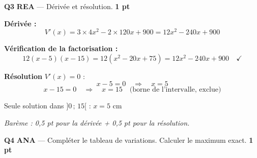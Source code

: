 \documentclass[a4paper,11pt]{article}
\newcommand{\pts}[1]{\hfill\textcolor{gris}{\small\textbf{#1}}}
\newcommand{\comp}[1]{\colorbox{blue!10}{\scriptsize\textbf{#1}}}
\begin{document}
\textbf{Q3} \comp{REA} — Dérivée et résolution. \pts{1 pt}

\begin{corrbox}
\textbf{Dérivée :}
\[
V'(x) = 3 \times 4x^2 - 2 \times 120x + 900 = 12x^2 - 240x + 900
\]

\textbf{Vérification de la factorisation :}
\[
12(x-5)(x-15) = 12(x^2 - 20x + 75) = 12x^2 - 240x + 900 \quad \checkmark
\]

\textbf{Résolution} $V'(x) = 0$ :
\[
x - 5 = 0 \quad \Rightarrow \quad \boxed{x = 5}
\]
\[
x - 15 = 0 \quad \Rightarrow \quad x = 15 \quad \text{(borne de l'intervalle, exclue)}
\]

Seule solution dans $]0\,;\,15[$ : $\boxed{x = 5 \text{ cm}}$

\smallskip
\textit{Barème : 0,5 pt pour la dérivée + 0,5 pt pour la résolution.}
\end{corrbox}

\textbf{Q4} \comp{ANA} — Compléter le tableau de variations. Calculer le maximum exact. \pts{1 pt}
\end{document}
